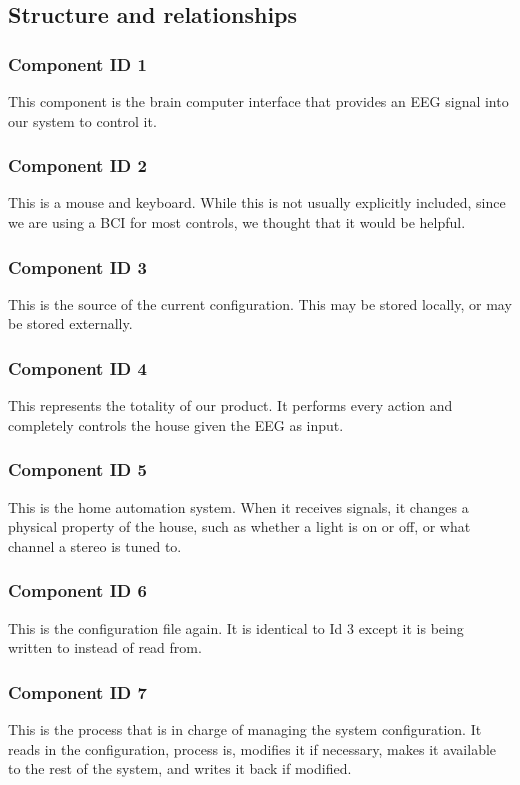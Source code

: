 \documentclass{article}
\begin{document}
\subsection{Structure and relationships}

\subsubsection{Component ID 1}
This component is the brain computer interface that provides an EEG signal into our system to control it.

\subsubsection{Component ID 2}
This is a mouse and keyboard. While this is not usually explicitly included, since we are using a BCI for most controls, we thought that it would be helpful.

\subsubsection{Component ID 3}
This is the source of the current configuration. This may be stored locally, or may be stored externally.

\subsubsection{Component ID 4}
This represents the totality of our product. It performs every action and completely controls the house given the EEG as input.

\subsubsection{Component ID 5}
This is the home automation system. When it receives signals, it changes a physical property of the house, such as whether a light is on or off, or what channel a stereo is tuned to.

\subsubsection{Component ID 6}
This is the configuration file again. It is identical to Id 3 except it is being written to instead of read from.

\subsubsection{Component ID 7}
This is the process that is in charge of managing the system configuration. It reads in the configuration, process is, modifies it if necessary, makes it available to the rest of the system, and writes it back if modified.
\end{document}
